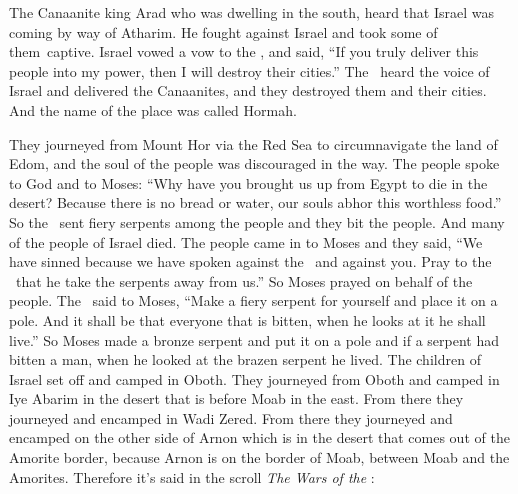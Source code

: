 
\begin{inparaenum}
   The Canaanite king Arad who was dwelling in the south, heard that Israel was coming by way of Atharim. He fought against Israel and took some of them\understood{}\ captive.%
   Israel vowed a vow to the \lord, and said, ``If you truly deliver this people into my power, then I will destroy their cities.''%
   The \lord\ heard the voice of Israel and delivered the Canaanites, and they destroyed them and their cities. And the name of the place was called Hormah.%

   They journeyed from Mount Hor via the Red Sea to circumnavigate the land of Edom, and the soul of the people was discouraged in the way.%
   The people spoke to God and to Moses: ``Why have you brought us up from Egypt to die in the desert? Because there is no bread or water, our souls abhor this worthless food.''%
   So the \lord\ sent fiery serpents among the people and they bit the people. And many of the people of Israel died.%
   The people came in to Moses and they said, ``We have sinned because we have spoken against the \lord\ and against you. Pray to the \lord\ that he take the serpents away from us.'' So Moses prayed on behalf of the people.%
   The \lord\ said to Moses, ``Make a fiery serpent for yourself and place it on a pole. And it shall be that everyone that is bitten, when he looks at it he shall live.''%
   So Moses made a bronze serpent and put it on a pole and if a serpent had bitten a man, when he looked at the brazen serpent he lived.%
   The children of Israel set off and camped in Oboth.%
   They journeyed from Oboth and camped in Iye Abarim in the desert that is before Moab in the east.%
   From there they journeyed and encamped in Wadi Zered.%
   From there they journeyed and encamped on the other side of Arnon which is in the desert that comes out of the Amorite border, because Arnon is on the border of Moab, between Moab and the Amorites.%
   Therefore it's said in the scroll \textit{The Wars of the \lord}:\smallskip%


\end{inparaenum}
